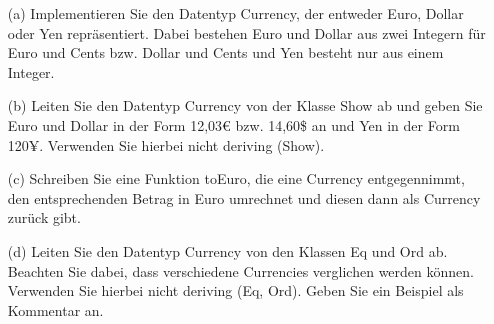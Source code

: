\begin{itemize}
  \item [(a)] Implementieren Sie den Datentyp Currency, der entweder Euro, Dollar oder Yen repräsentiert. Dabei bestehen Euro und Dollar aus zwei Integern für Euro und Cents bzw. Dollar und Cents und Yen besteht nur aus einem Integer.

  \item [(b)] Leiten Sie den Datentyp Currency von der Klasse Show ab und geben Sie Euro und Dollar in der Form 12,03€ bzw. 14,60\$ an und Yen in der Form 120¥. Verwenden Sie hierbei nicht deriving (Show).

  \item [(c)] Schreiben Sie eine Funktion toEuro, die eine Currency entgegennimmt, den entsprechenden Betrag in Euro umrechnet und diesen dann als Currency zurück gibt.

  \item [(d)] Leiten Sie den Datentyp Currency von den Klassen Eq und Ord ab. Beachten Sie dabei, dass verschiedene Currencies verglichen werden können. Verwenden Sie hierbei nicht deriving (Eq, Ord). Geben Sie ein Beispiel als Kommentar an.
  
  \newpage

  \inputminted{Haskell}{A5_5.hs}

\end{itemize}

